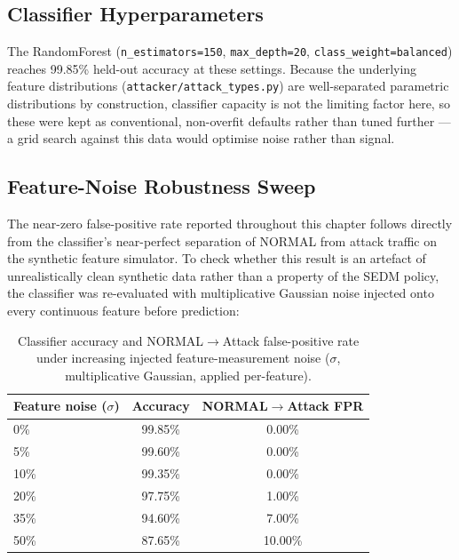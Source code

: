 \subsection{Classifier Hyperparameters}

The RandomForest (\texttt{n\_estimators=150}, \texttt{max\_depth=20},
\texttt{class\_weight=\textquotesingle balanced\textquotesingle}) reaches 99.85\% held-out
accuracy at these settings. Because the underlying feature distributions
(\texttt{attacker/attack\_types.py}) are well-separated parametric
distributions by construction, classifier capacity is not the limiting
factor here, so these were kept as conventional, non-overfit defaults
rather than tuned further — a grid search against this data would optimise
noise rather than signal.

\subsection{Feature-Noise Robustness Sweep}

The near-zero false-positive rate reported throughout this chapter follows
directly from the classifier's near-perfect separation of NORMAL from
attack traffic on the synthetic feature simulator. To check whether this
result is an artefact of unrealistically clean synthetic data rather than a
property of the SEDM policy, the classifier was re-evaluated with
multiplicative Gaussian noise injected onto every continuous feature before
prediction:

\begin{table}[ht]
  \centering
  \caption{Classifier accuracy and NORMAL$\to$Attack false-positive rate
           under increasing injected feature-measurement noise
           ($\sigma$, multiplicative Gaussian, applied per-feature).}
  \label{tab:noise_robustness}
  \begin{tabular}{lcc}
    \toprule
    Feature noise ($\sigma$) & Accuracy & NORMAL$\to$Attack FPR \\
    \midrule
    0\%  & 99.85\% & 0.00\%  \\
    5\%  & 99.60\% & 0.00\%  \\
    10\% & 99.35\% & 0.00\%  \\
    20\% & 97.75\% & 1.00\%  \\
    35\% & 94.60\% & 7.00\%  \\
    50\% & 87.65\% & 10.00\% \\
    \bottomrule
  \end{tabular}
\end{table}

